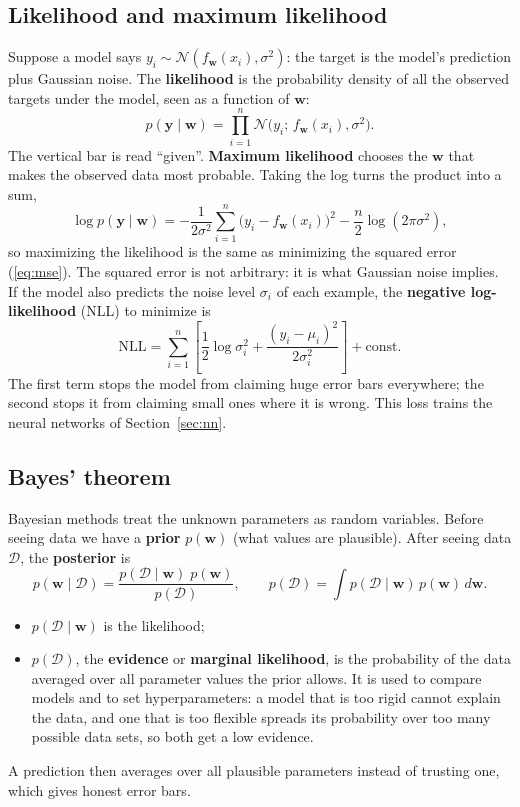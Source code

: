 \documentclass[11pt]{article}
\newcommand{\N}{\mathcal{N}}
\begin{document}
\subsection{Likelihood and maximum likelihood}
Suppose a model says $y_i \sim \N(f_{\bm w}(x_i), \sigma^2)$: the target is the model's prediction plus Gaussian noise. The
\textbf{likelihood} is the probability density of all the observed targets under the model, seen as a function of $\bm w$:
\begin{equation}
p(\bm y \mid \bm w) = \prod_{i=1}^{n}\N\bigl(y_i;\,f_{\bm w}(x_i), \sigma^2\bigr).
\end{equation}
The vertical bar is read ``given''. \textbf{Maximum likelihood} chooses the $\bm w$ that makes the observed data most probable.
Taking the log turns the product into a sum,
\begin{equation}
\log p(\bm y \mid \bm w) = -\frac{1}{2\sigma^2}\sum_{i=1}^{n}\bigl(y_i - f_{\bm w}(x_i)\bigr)^2 - \frac n2\log(2\pi\sigma^2),
\end{equation}
so maximizing the likelihood is the same as minimizing the squared error (\ref{eq:mse}). The squared error is not arbitrary: it is
what Gaussian noise implies. If the model also predicts the noise level $\sigma_i$ of each example, the \textbf{negative
log-likelihood} (NLL) to minimize is
\begin{equation}
\text{NLL} = \sum_{i=1}^{n}\left[\frac12\log\sigma_i^2 + \frac{(y_i - \mu_i)^2}{2\sigma_i^2}\right] + \text{const}.
\label{eq:nll}
\end{equation}
The first term stops the model from claiming huge error bars everywhere; the second stops it from claiming small ones where it
is wrong. This loss trains the neural networks of Section~\ref{sec:nn}.

\subsection{Bayes' theorem}
Bayesian methods treat the unknown parameters as random variables. Before seeing data we have a \textbf{prior} $p(\bm w)$ (what
values are plausible). After seeing data $\mathcal D$, the \textbf{posterior} is
\begin{equation}
p(\bm w \mid \mathcal D) = \frac{p(\mathcal D \mid \bm w)\;p(\bm w)}{p(\mathcal D)},\qquad
p(\mathcal D) = \int p(\mathcal D \mid \bm w)\,p(\bm w)\,d\bm w .
\label{eq:bayes}
\end{equation}
\begin{itemize}
\item $p(\mathcal D \mid \bm w)$ is the likelihood;
\item $p(\mathcal D)$, the \textbf{evidence} or \textbf{marginal likelihood}, is the probability of the data averaged over all
  parameter values the prior allows. It is used to compare models and to set hyperparameters: a model that is too rigid
  cannot explain the data, and one that is too flexible spreads its probability over too many possible data sets, so both get a
  low evidence.
\end{itemize}
A prediction then averages over all plausible parameters instead of trusting one, which gives honest error bars.
\end{document}

